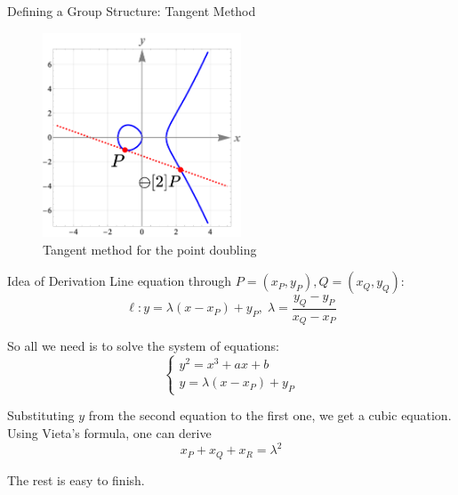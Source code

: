 \documentclass{beamer}
\begin{document}
    \begin{frame}{Defining a Group Structure: Tangent Method}
        \begin{figure}
            \centering
            \includegraphics[width=0.525\textwidth]{images/lecture_3/ec_illustration_5.png}
            \caption{Tangent method for the point doubling}
            \label{fig:ec_5}
        \end{figure}
    \end{frame}

    \begin{frame}{Idea of Derivation}
        Line equation through $P=(x_P,y_P),Q=(x_Q,y_Q)$:
        \begin{equation*}
            \ell: y = \lambda (x-x_P) + y_P, \; \lambda = \frac{y_Q-y_P}{x_Q-x_P}
        \end{equation*}

        \pause So all we need is to solve the system of equations:
        \begin{equation*}
            \begin{cases}
                y^2 = x^3+ax+b\\
                y = \lambda (x-x_P) + y_P
            \end{cases}
        \end{equation*}

        \pause Substituting $y$ from the second equation to the first one, we get a cubic equation. Using Vieta's formula, one can derive
        \begin{equation*}
            x_P + x_Q + x_R = \lambda^2
        \end{equation*}

        The rest is easy to finish.
    \end{frame}
\end{document}
